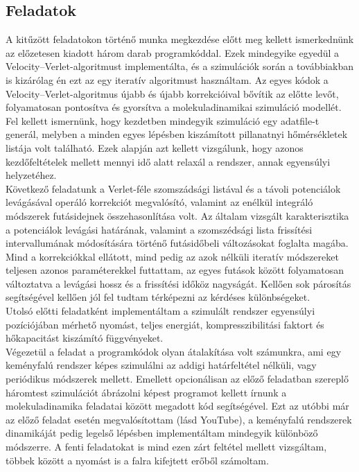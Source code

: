 \begin{multicols}{2}
\section{Feladatok} \label{sec:2}
A kitűzött feladatokon történő munka megkezdése előtt meg kellett ismerkednünk az előzetesen kiadott három darab programkóddal. Ezek mindegyike egyedül a Velocity--Verlet-algoritmust implementálta, és a szimulációk során a továbbiakban is kizárólag én ezt az egy iteratív algoritmust használtam. Az egyes kódok a Velocity--Verlet-algoritmus újabb és újabb korrekcióival bővítik az előtte levőt, folyamatosan pontosítva és gyorsítva a molekuladinamikai szimuláció modellét. \\
Fel kellett ismernünk, hogy kezdetben mindegyik szimuláció egy adatfile-t generál, melyben a minden egyes lépésben kiszámított pillanatnyi hőmérsékletek listája volt található. Ezek alapján azt kellett vizsgálunk, hogy azonos kezdőfeltételek mellett mennyi idő alatt relaxál a rendszer, annak egyensúlyi helyzetéhez. \\
Következő feladatunk a Verlet-féle szomszádsági listával és a távoli potenciálok levágásával operáló korrekciót megvalósító, valamint az enélkül integráló módszerek futásidejnek összehasonlítása volt. Az általam vizsgált karakterisztika a potenciálok levágási határának, valamint a szomszédsági lista frissítési intervallumának módosítására történő futásidőbeli változásokat foglalta magába. Mind a korrekciókkal ellátott, mind pedig az azok nélküli iteratív módszereket teljesen azonos paraméterekkel futtattam, az egyes futások között folyamatosan változtatva a levágási hossz és a frissítési időköz nagyságát. Kellően sok párosítás segítségével kellően jól fel tudtam térképezni az kérdéses különbségeket. \\
Utolsó előtti feladatként implementáltam a szimulált rendszer egyensúlyi pozíciójában mérhető nyomást, teljes energiát, kompresszibilitási faktort és hőkapacitást kiszámító függvényeket. \\
Végezetül a feladat a programkódok olyan átalakítása volt számunkra, ami egy keményfalú rendszer képes szimulálni az addigi határfeltétel nélküli, vagy periódikus módszerek mellett. Emellett opcionálisan az előző feladatban szereplő háromtest szimulációt ábrázolni képest programot kellett írnunk a molekuladinamika feladatai között megadott kód segítségével. Ezt az utóbbi már az előző feladat esetén megvalósítottam (lásd YouTube\cite{yt}), a keményfalú rendszerek dinamikáját pedig legelső lépésben implementáltam mindegyik különböző módszerre. A fenti feladatokat is mind ezen zárt feltétel mellett vizsgáltam, többek között a nyomást is a falra kifejtett erőből számoltam.


\end{multicols}
